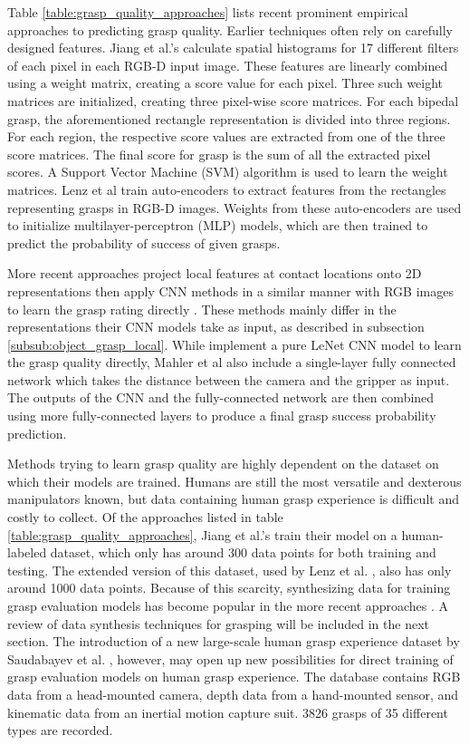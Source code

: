 Table \ref{table:grasp_quality_approaches} lists recent prominent empirical approaches to predicting grasp quality.
Earlier techniques often rely on carefully designed features. Jiang et al.'s \cite{jiang2011} calculate spatial
histograms for 17 different filters of each pixel in each RGB-D input image. These features are linearly combined using
a weight matrix, creating a score value for each pixel. Three such weight matrices are initialized, creating three
pixel-wise score matrices. For each bipedal grasp, the aforementioned rectangle representation is divided into three
regions. For each region, the respective score values are extracted from one of the three score matrices. The final
score for grasp is the sum of all the extracted pixel scores. A Support Vector Machine (SVM) algorithm is used to learn
the weight matrices. Lenz et al \cite{lenz2015} train auto-encoders to extract features from the rectangles
representing grasps in RGB-D images. Weights from these auto-encoders are used to initialize multilayer-perceptron
(MLP) models, which are then trained to predict the probability of success of given grasps.

More recent approaches project local features at contact locations onto 2D representations then apply CNN methods in a
similar manner with RGB images to learn the grasp rating directly \cite{Gualtieri2016,mahler2017,Kappler2015}. These
methods mainly differ in the representations their CNN models take as input, as described in subsection
\ref{subsub:object_grasp_local}. While \cite{Gualtieri2016,Kappler2015} implement a pure LeNet CNN model \cite{Gu2018}
to learn the grasp quality directly, Mahler et al \cite{mahler2017} also include a single-layer fully connected network
which takes the distance between the camera and the gripper as input. The outputs of the CNN and the fully-connected
network are then combined using more fully-connected layers to produce a final grasp success probability prediction.

Methods trying to learn grasp quality are highly dependent on the dataset on which their models are trained. Humans
are still the most versatile and dexterous manipulators known, but data containing human grasp experience is difficult
and costly to collect. Of the approaches listed in table \ref{table:grasp_quality_approaches}, Jiang et al.'s
\cite{jiang2011} train their model on a human-labeled dataset, which only has around 300 data points for both training
and testing. The extended version of this dataset, used by Lenz et al. \cite{lenz2015}, also has only around 1000 data
points. Because of this scarcity, synthesizing data for training grasp evaluation models has become popular in the more
recent approaches \cite{Kappler2015,Gualtieri2016,mahler2017}. A review of data synthesis techniques for grasping will
be included in the next section. The introduction of a new large-scale human grasp experience dataset by Saudabayev et
al. \cite{Saudabayev2018}, however, may open up new possibilities for direct training of grasp evaluation models on
human grasp experience. The database contains RGB data from a head-mounted camera, depth data from a hand-mounted
sensor, and kinematic data from an inertial motion capture suit. 3826 grasps of 35 different types are recorded.


